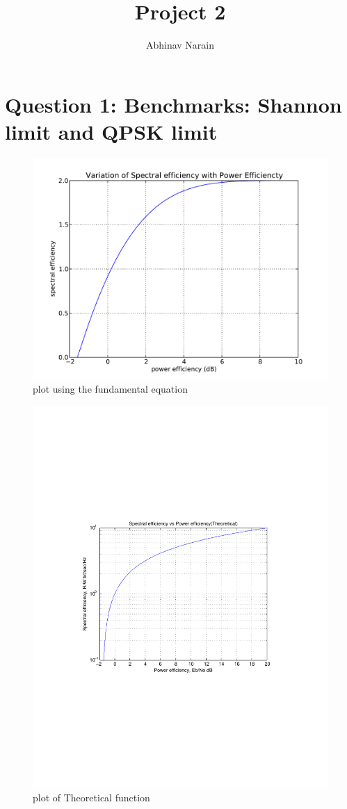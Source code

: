 \documentclass[11pt, english]{article}
\title{ Project 2 }
\date{}
\author{Abhinav Narain}
\begin{document}
\maketitle
\pagebreak
\section{Question 1: Benchmarks: Shannon limit and QPSK limit}
\begin{figure}[H]
    \centering
    \includegraphics[width=.8\textwidth]{real_limit.pdf}
    \caption{plot using the fundamental equation}
    \label{rl}
\end{figure}
\begin{figure}[H]
    \centering
    \includegraphics[width=.8\textwidth]{theoretical_limit.pdf}
    \caption{plot of Theoretical function}
    \label{th1}
\end{figure}
\end{document}
